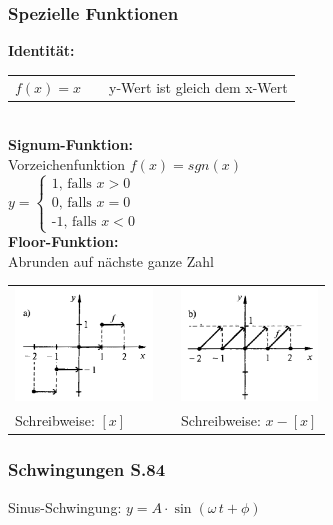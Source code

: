 		\subsubsection{Spezielle Funktionen}
			\textbf{Identität:} \\
				\begin{tabular}{lll}
					$f(x) = x$ & &  y-Wert ist gleich dem x-Wert 
				\end{tabular}
			\\
			\textbf{Signum-Funktion:} \\
				Vorzeichenfunktion $f(x)=sgn(x)$\\
				$y= \left\{\begin{array}{l}\text{1, falls $x>0$} \\
					                       \text{0, falls $x=0$} \\
					                       \text{-1, falls $x<0$}\end{array}\right.$
			\\	
			\textbf{Floor-Funktion:} \\
			 	Abrunden auf nächste ganze Zahl \\
			
				\begin{tabular}{lll}
					\includegraphics[height=3cm]{Bilder/floor-funktion} & &  \includegraphics[height=3cm]{Bilder/saegezahn-funktion} \\
					Schreibweise: \textbf{$[x]$}                        & &  Schreibweise: \textbf{$x - [x]$} \\
				\end{tabular}
			
		\subsubsection{Schwingungen S.84}
			Sinus-Schwingung:  $y = A \cdot \sin(\omega \, t + \phi)$ \\
			
